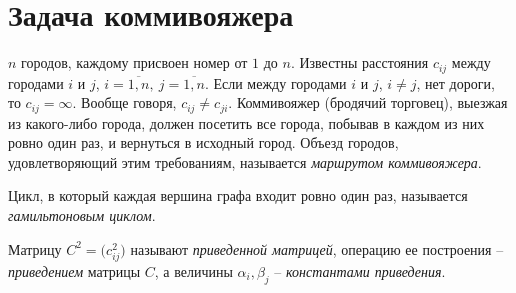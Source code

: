 \setcounter{section}{3}
\section{Задача коммивояжера}


\begin{definition}
  $n$ городов, каждому присвоен номер от $1$ до $n$. Известны расстояния $c_{ij} $ между городами $i$ и $j$, $i = \overline{1,n}, \ j = \overline{1,n}$. Если между городами $i$ и $j$, $i \ne j$, нет дороги, то $c_{ij} = \infty $. Вообще говоря, $c_{ij} \ne c_{ji} $. Коммивояжер (бродячий торговец), выезжая из какого-либо города, должен посетить все города, побывав в каждом из них ровно один раз, и вернуться в исходный город. Объезд городов, удовлетворяющий этим требованиям, называется \emph{маршрутом коммивояжера}.
\end{definition}

\begin{definition}
  Цикл, в который каждая вершина графа входит ровно один раз, называется \emph{гамильтоновым циклом}.
\end{definition}

\begin{definition}
  Матрицу $C^2 = \big(c_{ij}^{2} \big)$ называют \emph{приведенной матрицей}, операцию ее построения -- \emph{приведением} матрицы $C$, а величины $\alpha _i, \beta _j$ -- \emph{константами приведения}.
\end{definition}
